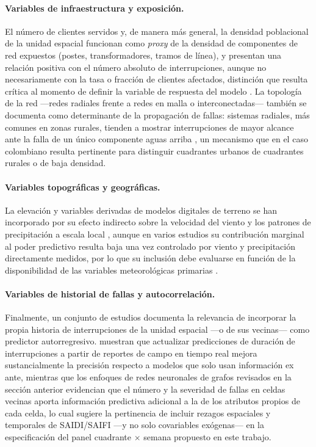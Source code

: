 \paragraph{Variables de infraestructura y exposición.} El número de clientes servidos y, de manera más general, la densidad poblacional de la unidad espacial funcionan como \emph{proxy} de la densidad de componentes de red expuestos (postes, transformadores, tramos de línea), y presentan una relación positiva con el número absoluto de interrupciones, aunque no necesariamente con la tasa o fracción de clientes afectados, distinción que resulta crítica al momento de definir la variable de respuesta del modelo \parencite{ref43}. La topología de la red —redes radiales frente a redes en malla o interconectadas— también se documenta como determinante de la propagación de fallas: sistemas radiales, más comunes en zonas rurales, tienden a mostrar interrupciones de mayor alcance ante la falla de un único componente aguas arriba \parencite{ref43}, un mecanismo que en el caso colombiano resulta pertinente para distinguir cuadrantes urbanos de cuadrantes rurales o de baja densidad.

\paragraph{Variables topográficas y geográficas.} La elevación y variables derivadas de modelos digitales de terreno se han incorporado por su efecto indirecto sobre la velocidad del viento y los patrones de precipitación a escala local \parencite{ref43}, aunque en varios estudios su contribución marginal al poder predictivo resulta baja una vez controlado por viento y precipitación directamente medidos, por lo que su inclusión debe evaluarse en función de la disponibilidad de las variables meteorológicas primarias \parencite{ref43}.

\paragraph{Variables de historial de fallas y autocorrelación.} Finalmente, un conjunto de estudios documenta la relevancia de incorporar la propia historia de interrupciones de la unidad espacial —o de sus vecinas— como predictor autorregresivo. \textcite{ref33} muestran que actualizar predicciones de duración de interrupciones a partir de reportes de campo en tiempo real mejora sustancialmente la precisión respecto a modelos que solo usan información ex ante, mientras que los enfoques de redes neuronales de grafos revisados en la sección anterior \parencite{ref14} evidencian que el número y la severidad de fallas en celdas vecinas aporta información predictiva adicional a la de los atributos propios de cada celda, lo cual sugiere la pertinencia de incluir rezagos espaciales y temporales de SAIDI/SAIFI —y no solo covariables exógenas— en la especificación del panel cuadrante $\times$ semana propuesto en este trabajo.
